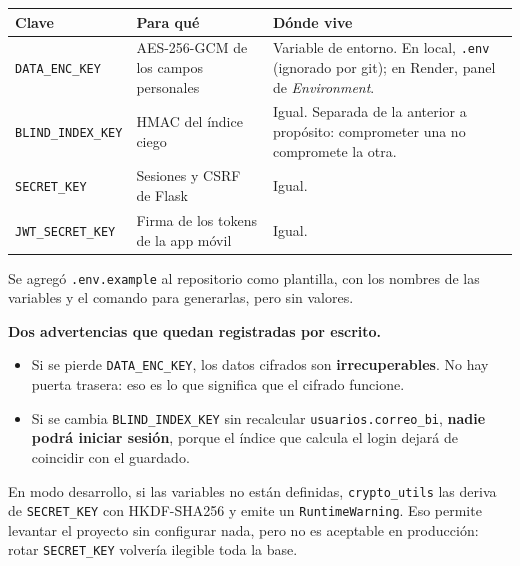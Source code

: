 \documentclass[11pt,letterpaper]{article}
\begin{document}
\begin{center}
\small
\begin{tabular}{@{}>{\raggedright\arraybackslash}p{3.6cm} >{\raggedright\arraybackslash}p{4.0cm} >{\raggedright\arraybackslash}p{6.6cm}@{}}
\toprule
\textbf{Clave} & \textbf{Para qué} & \textbf{Dónde vive} \\
\midrule
\texttt{DATA\_ENC\_KEY}    & AES-256-GCM de los campos personales & Variable de entorno. En local, \texttt{.env} (ignorado por git); en Render, panel de \emph{Environment}. \\[3pt]
\texttt{BLIND\_INDEX\_KEY} & HMAC del índice ciego                & Igual. Separada de la anterior a propósito: comprometer una no compromete la otra. \\[3pt]
\texttt{SECRET\_KEY}       & Sesiones y CSRF de Flask             & Igual. \\[3pt]
\texttt{JWT\_SECRET\_KEY}  & Firma de los tokens de la app móvil  & Igual. \\
\bottomrule
\end{tabular}
\end{center}

Se agregó \texttt{.env.example} al repositorio como plantilla, con los nombres
de las variables y el comando para generarlas, pero sin valores.

\begin{alerta}
\textbf{Dos advertencias que quedan registradas por escrito.}
\begin{itemize}[leftmargin=1.3em,itemsep=2pt,topsep=3pt]
  \item Si se pierde \texttt{DATA\_ENC\_KEY}, los datos cifrados son
        \textbf{irrecuperables}. No hay puerta trasera: eso es lo que significa
        que el cifrado funcione.
  \item Si se cambia \texttt{BLIND\_INDEX\_KEY} sin recalcular
        \texttt{usuarios.correo\_bi}, \textbf{nadie podrá iniciar sesión},
        porque el índice que calcula el login dejará de coincidir con el
        guardado.
\end{itemize}
En modo desarrollo, si las variables no están definidas, \texttt{crypto\_utils}
las deriva de \texttt{SECRET\_KEY} con HKDF-SHA256 y emite un
\texttt{RuntimeWarning}. Eso permite levantar el proyecto sin configurar nada,
pero no es aceptable en producción: rotar \texttt{SECRET\_KEY} volvería
ilegible toda la base.
\end{alerta}
\end{document}
